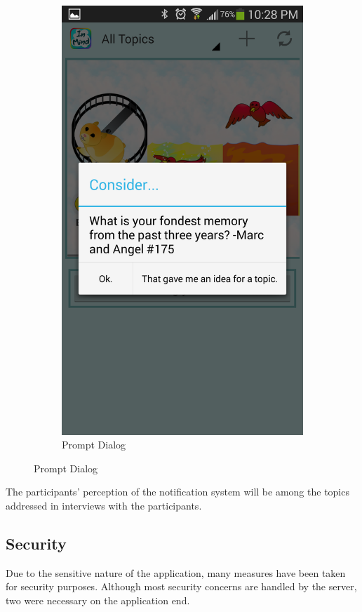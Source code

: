 \begin{figure}
\begin{subfigure}[b]{0.3\textwidth}
        \includegraphics[width=\textwidth]{prompt_dialog.png}
        \caption{Prompt Dialog}
      \end{subfigure}
      \label{fig:notification}
    \end{figure}


      The participants' perception of the notification system will
      be among the topics addressed in interviews with the participants.

    \subsection{Security}
      Due to the sensitive nature of the application,
      many measures have been taken for security purposes.
      Although most security concerns are handled by the server,
      two were necessary on the application end.

